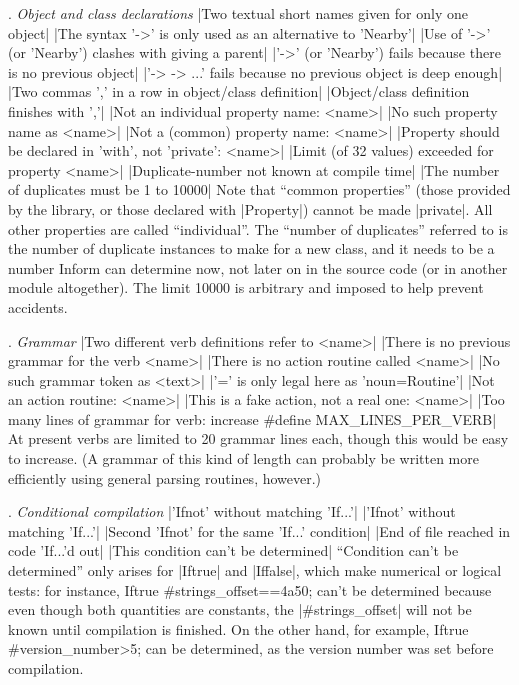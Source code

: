 \medskip{}. {\sl Object and class declarations}
\beginlines
|Two textual short names given for only one object|
|The syntax '->' is only used as an alternative to 'Nearby'|
|Use of '->' (or 'Nearby') clashes with giving a parent|
|'->' (or 'Nearby') fails because there is no previous object|
|'-> -> ...' fails because no previous object is deep enough|
|Two commas ',' in a row in object/class definition|
|Object/class definition finishes with ','|
|Not an individual property name: <name>|
|No such property name as <name>|
|Not a (common) property name: <name>|
|Property should be declared in 'with', not 'private': <name>|
|Limit (of 32 values) exceeded for property <name>|
|Duplicate-number not known at compile time|
|The number of duplicates must be 1 to 10000|
\endlines
Note that ``common properties'' (those provided by the library,
or those declared with |Property|) cannot be made |private|.
All other properties are called ``individual''.  The ``number
of duplicates'' referred to is the number of duplicate instances
to make for a new class, and it needs to be a number Inform can
determine now, not later on in the source code (or in another
module altogether).  The limit 10000 is arbitrary and imposed to
help prevent accidents.

\medskip{}. {\sl Grammar}
\beginlines
|Two different verb definitions refer to <name>|
|There is no previous grammar for the verb <name>|
|There is no action routine called <name>|
|No such grammar token as <text>|
|'=' is only legal here as 'noun=Routine'|
|Not an action routine: <name>|
|This is a fake action, not a real one: <name>|
|Too many lines of grammar for verb: increase #define MAX_LINES_PER_VERB|
\endlines
At present verbs are limited to 20 grammar lines each, though this
would be easy to increase.  (A grammar of this kind of length
can probably be written more efficiently using general parsing
routines, however.)

\medskip{}. {\sl Conditional compilation}
\beginlines
|'Ifnot' without matching 'If...'|
|'Ifnot' without matching 'If...'|
|Second 'Ifnot' for the same 'If...' condition|
|End of file reached in code 'If...'d out|
|This condition can't be determined|
\endlines
``Condition can't be determined'' only arises for |Iftrue|
and |Iffalse|, which make numerical or logical tests: for instance,
\beginstt
    Iftrue #strings_offset==$$4a50;
\endtt
can't be determined because even though both quantities are
constants, the |#strings_offset| will not be known until compilation
is finished.  On the other hand, for example,
\beginstt
    Iftrue #version_number>5;
\endtt
can be determined, as the version number was set before compilation.

